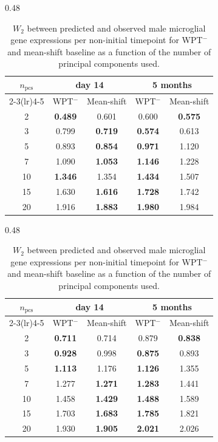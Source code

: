 \documentclass[11pt]{article}
\begin{document}
\begin{table}[h]
\centering
\small

\begin{subtable}[t]{0.48\textwidth}
\centering
\begin{tabular}{ccccc}
\toprule
$n_{\mathrm{pcs}}$ & \multicolumn{2}{c}{day 14} & \multicolumn{2}{c}{5 months} \\
\cmidrule(lr){2-3}\cmidrule(lr){4-5}
 & WPT$^-$ & Mean-shift & WPT$^-$ & Mean-shift \\
\midrule
2  & \textbf{0.489} & 0.601 & 0.600 & \textbf{0.575} \\
3  & 0.799 & \textbf{0.719} & \textbf{0.574} & 0.613 \\
5  & 0.893 & \textbf{0.854} & \textbf{0.971} & 1.120 \\
7  & 1.090 & \textbf{1.053} & \textbf{1.146} & 1.228 \\
10 & \textbf{1.346} & 1.354 & \textbf{1.434} & 1.507 \\
15 & 1.630 & \textbf{1.616} & \textbf{1.728} & 1.742 \\
20 & 1.916 & \textbf{1.883} & \textbf{1.980} & 1.984 \\
\bottomrule
\end{tabular}
\caption{Sham}
\label{tab:mf_w2_npcs_sham}
\end{subtable}
\hfill
\begin{subtable}[t]{0.48\textwidth}
\centering
\begin{tabular}{ccccc}
\toprule
$n_{\mathrm{pcs}}$ & \multicolumn{2}{c}{day 14} & \multicolumn{2}{c}{5 months} \\
\cmidrule(lr){2-3}\cmidrule(lr){4-5}
 & WPT$^-$ & Mean-shift & WPT$^-$ & Mean-shift \\
\midrule
2  & \textbf{0.711} & 0.714 & 0.879 & \textbf{0.838} \\
3  & \textbf{0.928} & 0.998 & \textbf{0.875} & 0.893 \\
5  & \textbf{1.113} & 1.176 & \textbf{1.126} & 1.355 \\
7  & 1.277 & \textbf{1.271} & \textbf{1.283} & 1.441 \\
10 & 1.458 & \textbf{1.429} & \textbf{1.488} & 1.589 \\
15 & 1.703 & \textbf{1.683} & \textbf{1.785} & 1.821 \\
20 & 1.930 & \textbf{1.905} & \textbf{2.021} & 2.026 \\
\bottomrule
\end{tabular}
\caption{SNI}
\label{tab:mf_w2_npcs_sni}
\end{subtable}

\caption{$W_2$ between predicted and observed male microglial gene expressions per non-initial timepoint for WPT$^-$ and mean-shift baseline as a function of the number of principal components used.}
\label{tab:mf_w2_npcs}
\end{table}
\end{document}
